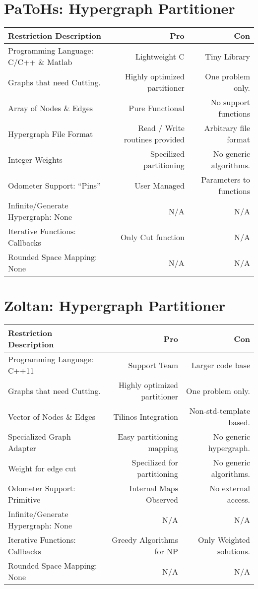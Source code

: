 \documentclass{article}
\begin{document}
\newpage
\section{PaToHs: Hypergraph Partitioner}
\begin{tabular}{| l | r | r |}
		\hline
		Restriction Description & Pro & Con \\
		\hline
		Programming Language: C/C++ \& Matlab & Lightweight C & Tiny Library \\
		Graphs that need Cutting. & Highly optimized partitioner & One problem only.\\
		Array of Nodes \& Edges & Pure Functional & No support functions\\
		Hypergraph File Format & Read / Write routines provided & Arbitrary file format\\
		Integer Weights & Specilized partitioning & No generic algorithms.\\
		\hline
		\hline
		Odometer Support: ``Pins'' & User Managed & Parameters to functions\\
		Infinite/Generate Hypergraph: None & N/A & N/A \\
		Iterative Functions: Callbacks & Only Cut function & N/A\\
		Rounded Space Mapping: None & N/A & N/A \\
		\hline
\end{tabular}

\newpage
\section{Zoltan: Hypergraph Partitioner}
\begin{tabular}{| l | r | r |}
	\hline
	Restriction Description & Pro & Con \\
	\hline
	Programming Language: C++11 & Support Team & Larger code base \\
	Graphs that need Cutting. & Highly optimized partitioner & One problem only.\\
	Vector of Nodes \& Edges & Tilinos Integration & Non-std-template based.\\
	Specialized Graph Adapter & Easy partitioning mapping & No generic hypergraph.\\
	Weight for edge cut & Specilized for partitioning & No generic algorithms.\\
	\hline
	\hline
	Odometer Support: Primitive & Internal Maps Observed & No external access.\\
	Infinite/Generate Hypergraph: None & N/A & N/A \\
	Iterative Functions: Callbacks & Greedy Algorithms for NP & Only Weighted solutions.\\
	
	Rounded Space Mapping: None & N/A & N/A \\
	\hline
\end{tabular}
\end{document}
